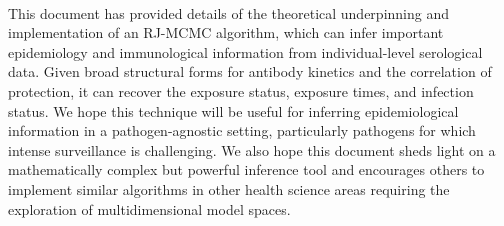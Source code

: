 \paragraph{}This document has provided details of the theoretical underpinning and implementation of an RJ-MCMC algorithm, which can infer important epidemiology and immunological information from individual-level serological data. Given broad structural forms for antibody kinetics and the correlation of protection, it can recover the exposure status, exposure times, and infection status. We hope this technique will be useful for inferring epidemiological information in a pathogen-agnostic setting, particularly pathogens for which intense surveillance is challenging. We also hope this document sheds light on a mathematically complex but powerful inference tool and encourages others to implement similar algorithms in other health science areas requiring the exploration of multidimensional model spaces. 
